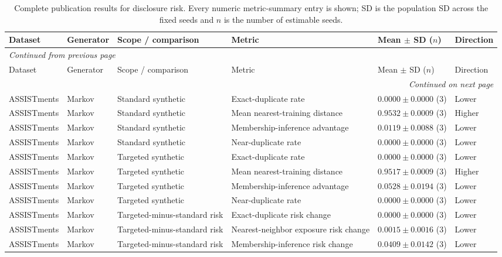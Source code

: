 \scriptsize
\setlength{\tabcolsep}{3pt}
\begin{longtable}{@{}p{2.25cm}p{2.05cm}p{4.7cm}p{5.0cm}p{2.6cm}p{1.25cm}@{}}
\caption{Complete publication results for disclosure risk. Every numeric metric-summary entry is shown; SD is the population SD across the fixed seeds and $n$ is the number of estimable seeds.}\label{tab:supp-disclosure-risk}\\
\toprule
Dataset & Generator & Scope / comparison & Metric & Mean $\pm$ SD ($n$) & Direction \\
\midrule
\endfirsthead
\multicolumn{6}{l}{\textit{Continued from previous page}}\\
\toprule
Dataset & Generator & Scope / comparison & Metric & Mean $\pm$ SD ($n$) & Direction \\
\midrule
\endhead
\midrule
\multicolumn{6}{r}{\textit{Continued on next page}}\\
\endfoot
\bottomrule
\endlastfoot
ASSISTments & Markov & Standard synthetic & Exact-duplicate rate & $0.0000 \mathbin{\pm} 0.0000$ (3) & Lower \\
ASSISTments & Markov & Standard synthetic & Mean nearest-training distance & $0.9532 \mathbin{\pm} 0.0009$ (3) & Higher \\
ASSISTments & Markov & Standard synthetic & Membership-inference advantage & $0.0119 \mathbin{\pm} 0.0088$ (3) & Lower \\
ASSISTments & Markov & Standard synthetic & Near-duplicate rate & $0.0000 \mathbin{\pm} 0.0000$ (3) & Lower \\
ASSISTments & Markov & Targeted synthetic & Exact-duplicate rate & $0.0000 \mathbin{\pm} 0.0000$ (3) & Lower \\
ASSISTments & Markov & Targeted synthetic & Mean nearest-training distance & $0.9517 \mathbin{\pm} 0.0009$ (3) & Higher \\
ASSISTments & Markov & Targeted synthetic & Membership-inference advantage & $0.0528 \mathbin{\pm} 0.0194$ (3) & Lower \\
ASSISTments & Markov & Targeted synthetic & Near-duplicate rate & $0.0000 \mathbin{\pm} 0.0000$ (3) & Lower \\
ASSISTments & Markov & Targeted-minus-standard risk & Exact-duplicate risk change & $0.0000 \mathbin{\pm} 0.0000$ (3) & Lower \\
ASSISTments & Markov & Targeted-minus-standard risk & Nearest-neighbor exposure risk change & $0.0015 \mathbin{\pm} 0.0016$ (3) & Lower \\
ASSISTments & Markov & Targeted-minus-standard risk & Membership-inference risk change & $0.0409 \mathbin{\pm} 0.0142$ (3) & Lower \\

\end{longtable}

